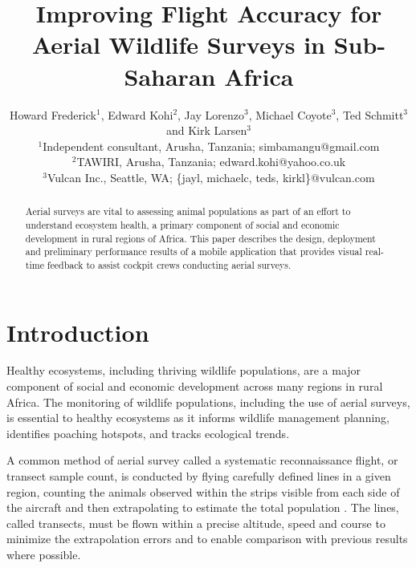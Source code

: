 \documentclass{sig-alternate-2013}
\begin{document}
\title{Improving Flight Accuracy for Aerial Wildlife Surveys in Sub-Saharan Africa}
\author{
Howard Frederick$^{1}$, Edward Kohi$^{2}$, Jay Lorenzo$^{3}$, Michael Coyote$^{3}$, Ted Schmitt$^{3}$ and Kirk Larsen$^{3}$\\	
\affaddr$^{1}$Independent consultant, Arusha, Tanzania; simbamangu@gmail.com \\
\affaddr$^{2}$TAWIRI, Arusha, Tanzania; edward.kohi@yahoo.co.uk  \\
\affaddr$^{3}$Vulcan Inc., Seattle, WA; \{jayl, michaelc, teds, kirkl\}@vulcan.com
}
\maketitle

\begin{abstract}
Aerial surveys are vital to assessing animal populations as part of an effort to understand ecosystem health, a primary component of social and economic development in rural regions of Africa. This paper describes the design, deployment and preliminary performance results of a mobile application that provides visual real-time feedback to assist cockpit crews conducting aerial surveys.
\end{abstract}



\section{Introduction}
Healthy ecosystems, including thriving wildlife populations, are a major component of social and economic development across many regions in rural Africa. The monitoring of wildlife populations, including the use of aerial surveys, is essential to healthy ecosystems as it informs wildlife management planning, identifies poaching hotspots, and tracks ecological trends.

A common method of aerial survey called a systematic reconnaissance flight, or transect sample count, is conducted by flying carefully defined lines in a given region, counting the animals observed within the strips visible from each side of the aircraft and then extrapolating to estimate the total population \cite{mike}.  The lines, called transects, must be flown within a precise altitude, speed and course to minimize the extrapolation errors and to enable comparison with previous results where possible.  
\end{document}

